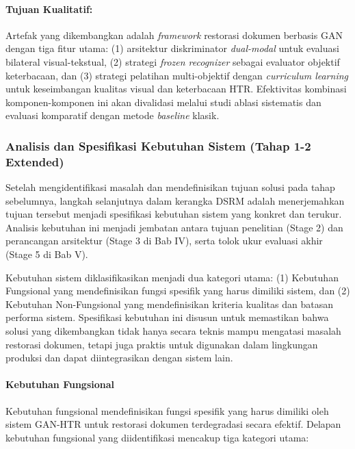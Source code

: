 \documentclass[12pt,a4paper]{article}
\begin{document}
\paragraph{Tujuan Kualitatif:}

Artefak yang dikembangkan adalah \textit{framework} restorasi dokumen berbasis GAN dengan tiga fitur utama: (1) arsitektur diskriminator \textit{dual-modal} untuk evaluasi bilateral visual-tekstual, (2) strategi \textit{frozen recognizer} sebagai evaluator objektif keterbacaan, dan (3) strategi pelatihan multi-objektif dengan \textit{curriculum learning} untuk keseimbangan kualitas visual dan keterbacaan HTR. Efektivitas kombinasi komponen-komponen ini akan divalidasi melalui studi ablasi sistematis dan evaluasi komparatif dengan metode \textit{baseline} klasik.

\subsubsection{Analisis dan Spesifikasi Kebutuhan Sistem (Tahap 1-2 Extended)}
\label{subsubsec:requirements-analysis}

Setelah mengidentifikasi masalah dan mendefinisikan tujuan solusi pada tahap sebelumnya, langkah selanjutnya dalam kerangka DSRM adalah menerjemahkan tujuan tersebut menjadi spesifikasi kebutuhan sistem yang konkret dan terukur. Analisis kebutuhan ini menjadi jembatan antara tujuan penelitian (Stage 2) dan perancangan arsitektur (Stage 3 di Bab IV), serta tolok ukur evaluasi akhir (Stage 5 di Bab V).

Kebutuhan sistem diklasifikasikan menjadi dua kategori utama: (1) Kebutuhan Fungsional yang mendefinisikan fungsi spesifik yang harus dimiliki sistem, dan (2) Kebutuhan Non-Fungsional yang mendefinisikan kriteria kualitas dan batasan performa sistem. Spesifikasi kebutuhan ini disusun untuk memastikan bahwa solusi yang dikembangkan tidak hanya secara teknis mampu mengatasi masalah restorasi dokumen, tetapi juga praktis untuk digunakan dalam lingkungan produksi dan dapat diintegrasikan dengan sistem lain.

\paragraph{Kebutuhan Fungsional}

Kebutuhan fungsional mendefinisikan fungsi spesifik yang harus dimiliki oleh sistem GAN-HTR untuk restorasi dokumen terdegradasi secara efektif. Delapan kebutuhan fungsional yang diidentifikasi mencakup tiga kategori utama:
\end{document}
